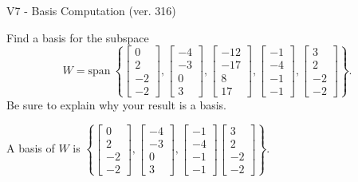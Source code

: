 \begin{exercise}
  \begin{exerciseTitle}V7 - Basis Computation (ver. 316)\end{exerciseTitle}
  \begin{exerciseStatement}
    Find a basis for the subspace 
\[W=\mathrm{span}\ \left\{\left[\begin{array}{r}
0 \\
2 \\
-2 \\
-2
\end{array}\right] , \left[\begin{array}{r}
-4 \\
-3 \\
0 \\
3
\end{array}\right] , \left[\begin{array}{r}
-12 \\
-17 \\
8 \\
17
\end{array}\right] , \left[\begin{array}{r}
-1 \\
-4 \\
-1 \\
-1
\end{array}\right] , \left[\begin{array}{r}
3 \\
2 \\
-2 \\
-2
\end{array}\right]\right\}.\]
 Be sure to explain why your result is a basis.


  \end{exerciseStatement}
  \begin{exerciseAnswer}
   A basis of \(W\) is  \(\left\{\left[\begin{array}{r}
0 \\
2 \\
-2 \\
-2
\end{array}\right] , \left[\begin{array}{r}
-4 \\
-3 \\
0 \\
3
\end{array}\right] , \left[\begin{array}{r}
-1 \\
-4 \\
-1 \\
-1
\end{array}\right] \left[\begin{array}{r}
3 \\
2 \\
-2 \\
-2
\end{array}\right]\right\}\).
  


  \end{exerciseAnswer}
\end{exercise}